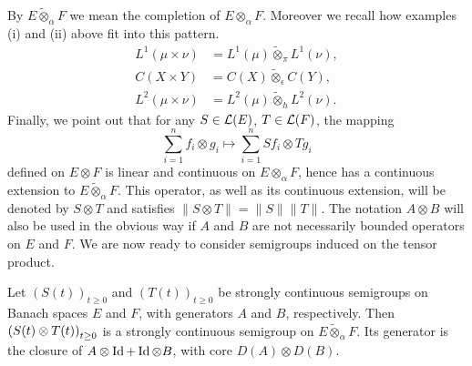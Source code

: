 By $E \widetilde{\otimes}_{\alpha} F$ we mean the completion of\/ $E \otimes_{\alpha} F$. 
Moreover we recall how examples (i) and (ii) above fit into this pattern.
\begin{align*}
    L^{1}(\mu \times \nu) &= L^{1}(\mu) \widetilde{\otimes}_{\pi} L^{1}(\nu), \\
    C(X \times Y)          &= C(X) \widetilde{\otimes}_{\epsilon} C(Y),          \\
    L^{2}(\mu \times \nu) &= L^{2}(\mu) \widetilde{\otimes}_{h} L^{2}(\nu).
\end{align*}
Finally, we point out that for any $S \in \mathcal{L}(E)$, $T \in \mathcal{L}(F) $, the mapping
\[
    \sum_{i=1}^{n}f_{i} \otimes g_{i} \mapsto \sum_{i=1}^{n}Sf_{i} \otimes Tg_{i}
\]
defined on $E \otimes F$ is linear and continuous on $E \otimes_{\alpha} F$, hence has a continuous extension to $ E \widetilde{\otimes}_{\alpha} F$. 
This operator, as well as its continuous extension, will be denoted by $S \otimes T$ and satisfies $\|S \otimes T\| = \|S\| \|T\|$. 
The notation $A \otimes B$ will also be used in the obvious way if\/ $A$ and $B$ are not necessarily bounded operators on $E$ and $F$. 
We are now ready to consider semigroups induced on the tensor product.
\begin{proposition*}\label{prop:a1-3.7}
Let $(S(t))_{t\geq 0}$ and $(T(t))_{t\geq 0}$ be strongly continuous semigroups on Banach spaces $E$ and $F$, with generators $A$ and $B$, 
respectively.
Then $\mleft(S(t) \otimes T(t)\mright)_{t\geq 0}$ is a strongly continuous 
semigroup on $E\widetilde{\otimes}_{\alpha}F$.
Its generator is the closure of $A \otimes \operatorname{Id} + \operatorname{Id} \otimes B$, with 
core $D(A) \otimes D(B)$.
\end{proposition*}
